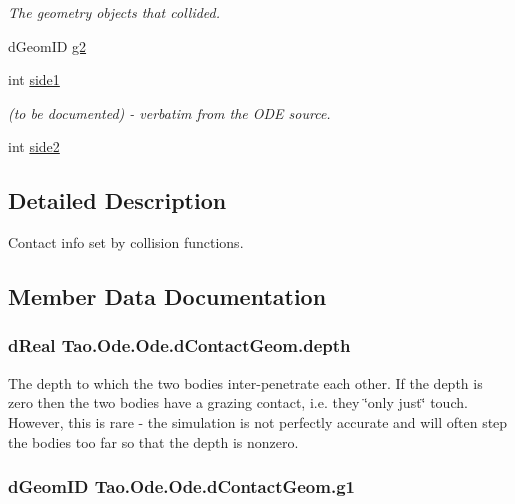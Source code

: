 \begin{DoxyCompactItemize}
\begin{DoxyCompactList}\small\item\em The geometry objects that collided. \item\end{DoxyCompactList}\item 
dGeomID \hyperlink{struct_tao_1_1_ode_1_1_ode_1_1d_contact_geom_aebc005fe750eff2bb88c1614c174b661}{g2}
\item 
int \hyperlink{struct_tao_1_1_ode_1_1_ode_1_1d_contact_geom_aaad9bfffdc405228cff24dd2758dbb6a}{side1}
\begin{DoxyCompactList}\small\item\em (to be documented) -\/ verbatim from the ODE source. \item\end{DoxyCompactList}\item 
int \hyperlink{struct_tao_1_1_ode_1_1_ode_1_1d_contact_geom_aac6ad362745afd88a6408a4565bd4c7a}{side2}
\end{DoxyCompactItemize}


\subsection{Detailed Description}
Contact info set by collision functions. 

\subsection{Member Data Documentation}
\hypertarget{struct_tao_1_1_ode_1_1_ode_1_1d_contact_geom_a648470146986b79fb8bab8d7de045436}{
\subsubsection[{depth}]{\setlength{\rightskip}{0pt plus 5cm}dReal {\bf Tao.Ode.Ode.dContactGeom.depth}}}
\label{struct_tao_1_1_ode_1_1_ode_1_1d_contact_geom_a648470146986b79fb8bab8d7de045436}


The depth to which the two bodies inter-\/penetrate each other. If the depth is zero then the two bodies have a grazing contact, i.e. they \char`\"{}only just\char`\"{} touch. However, this is rare -\/ the simulation is not perfectly accurate and will often step the bodies too far so that the depth is nonzero. 

\hypertarget{struct_tao_1_1_ode_1_1_ode_1_1d_contact_geom_a819c1e7e70bb41e8e70eff2c78e0fde2}{
\subsubsection[{g1}]{\setlength{\rightskip}{0pt plus 5cm}dGeomID {\bf Tao.Ode.Ode.dContactGeom.g1}}}
\label{struct_tao_1_1_ode_1_1_ode_1_1d_contact_geom_a819c1e7e70bb41e8e70eff2c78e0fde2}


